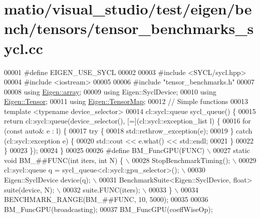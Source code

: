 \hypertarget{matio_2visual__studio_2test_2eigen_2bench_2tensors_2tensor__benchmarks__sycl_8cc_source}{}\section{matio/visual\+\_\+studio/test/eigen/bench/tensors/tensor\+\_\+benchmarks\+\_\+sycl.cc}
\label{matio_2visual__studio_2test_2eigen_2bench_2tensors_2tensor__benchmarks__sycl_8cc_source}

\begin{DoxyCode}
00001 \textcolor{preprocessor}{#define EIGEN\_USE\_SYCL}
00002 
00003 \textcolor{preprocessor}{#include <SYCL/sycl.hpp>}
00004 \textcolor{preprocessor}{#include <iostream>}
00005 
00006 \textcolor{preprocessor}{#include "tensor\_benchmarks.h"}
00007 
00008 \textcolor{keyword}{using} \hyperlink{class_eigen_1_1array}{Eigen::array};
00009 \textcolor{keyword}{using} Eigen::SyclDevice;
00010 \textcolor{keyword}{using} \hyperlink{class_eigen_1_1_tensor}{Eigen::Tensor};
00011 \textcolor{keyword}{using} \hyperlink{class_eigen_1_1_tensor_map}{Eigen::TensorMap};
00012 \textcolor{comment}{// Simple functions}
00013 \textcolor{keyword}{template} <\textcolor{keyword}{typename} device\_selector>
00014 cl::sycl::queue sycl\_queue() \{
00015   \textcolor{keywordflow}{return} cl::sycl::queue(device\_selector(), [=](cl::sycl::exception\_list l) \{
00016     \textcolor{keywordflow}{for} (\textcolor{keyword}{const} \textcolor{keyword}{auto}& e : l) \{
00017       \textcolor{keywordflow}{try} \{
00018         std::rethrow\_exception(e);
00019       \} \textcolor{keywordflow}{catch} (cl::sycl::exception e) \{
00020         std::cout << e.what() << std::endl;
00021       \}
00022     \}
00023   \});
00024 \}
00025 
00026 \textcolor{preprocessor}{#define BM\_FuncGPU(FUNC)                                       \(\backslash\)}
00027 \textcolor{preprocessor}{  static void BM\_##FUNC(int iters, int N) \{                    \(\backslash\)}
00028 \textcolor{preprocessor}{    StopBenchmarkTiming();                                     \(\backslash\)}
00029 \textcolor{preprocessor}{    cl::sycl::queue q = sycl\_queue<cl::sycl::gpu\_selector>();  \(\backslash\)}
00030 \textcolor{preprocessor}{    Eigen::SyclDevice device(q);                               \(\backslash\)}
00031 \textcolor{preprocessor}{    BenchmarkSuite<Eigen::SyclDevice, float> suite(device, N); \(\backslash\)}
00032 \textcolor{preprocessor}{    suite.FUNC(iters);                                         \(\backslash\)}
00033 \textcolor{preprocessor}{  \}                                                            \(\backslash\)}
00034 \textcolor{preprocessor}{  BENCHMARK\_RANGE(BM\_##FUNC, 10, 5000);}
00035 
00036 BM\_FuncGPU(broadcasting);
00037 BM\_FuncGPU(coeffWiseOp);
\end{DoxyCode}
